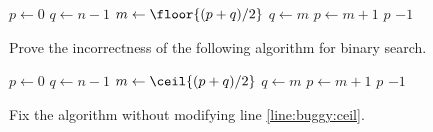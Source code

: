 \begin{solution}[Alternative] \leavevmode
    \begin{algorithm}
        \begin{algorithmic}[1]
                \State $p \gets 0$
                \State $q \gets n - 1$
                    \State $m \gets \floor{(p + q) / 2}$
                        \State $q \gets m$
                    \Else
                        \State $p \gets m + 1$
                    \EndIf
                \EndWhile
                    \State \Return $p$
                \Else
                    \State \Return $-1$
                \EndIf
            \EndFunction
        \end{algorithmic}
    \end{algorithm}
\end{solution}

\begin{problem} \label{prb:analysis:buggy_binary}
    Prove the incorrectness of the following algorithm for binary search.
    \begin{algorithmic}[1]
            \State $p \gets 0$
            \State $q \gets n - 1$
                \State $m \gets \ceil{(p + q) / 2}$ \label{line:buggy:ceil}
                    \State $q \gets m$
                \Else
                    \State $p \gets m + 1$
                \EndIf
            \EndWhile
                \State \Return $p$
            \Else
                \State \Return $-1$
            \EndIf
        \EndFunction
    \end{algorithmic}
    Fix the algorithm without modifying line \ref{line:buggy:ceil}.
\end{problem}
